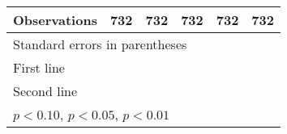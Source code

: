 \begin{table}[htbp]
\begin{tabular}{l*{5}{c}}
\midrule
Observations        &         732         &         732         &         732         &         732         &         732         \\
\bottomrule
\multicolumn{6}{l}{\footnotesize Standard errors in parentheses}\\
\multicolumn{6}{l}{\footnotesize First line}\\
\multicolumn{6}{l}{\footnotesize Second line}\\
\multicolumn{6}{l}{\footnotesize \sym{*} \(p<0.10\), \sym{**} \(p<0.05\), \sym{***} \(p<0.01\)}\\
\end{tabular}
\end{table}
